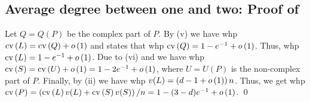 \subsection[Average degree between one and two]{Average degree between one and two: Proof of }
Let $Q=Q(P)$ be the complex part of $P$. By (v) we have whp $\operatorname{cv}\left(L\right)=\operatorname{cv}\left(Q\right)+o\left(1\right)$ and  states that whp $\operatorname{cv}\left(Q\right)=1-e^{-1}+o\left(1\right)$. Thus, whp $\operatorname{cv}\left(L\right)=1-e^{-1}+o\left(1\right)$. Due to (vi) and  we have whp $\operatorname{cv}\left(S\right)=\operatorname{cv}\left(U\right)+o\left(1\right)=1-2e^{-1}+o\left(1\right)$, where $U=U(P)$ is the non-complex part of $P$. Finally, by (ii) we have whp $v(L)=\left(d-1+o\left(1\right)\right)n$. Thus, we get whp $\operatorname{cv}\left(P\right)=\left(\operatorname{cv}\left(L\right)v(L)+\operatorname{cv}\left(S\right)v(S)\right)/n=1-(3-d)e^{-1}+o\left(1\right)$. \qed